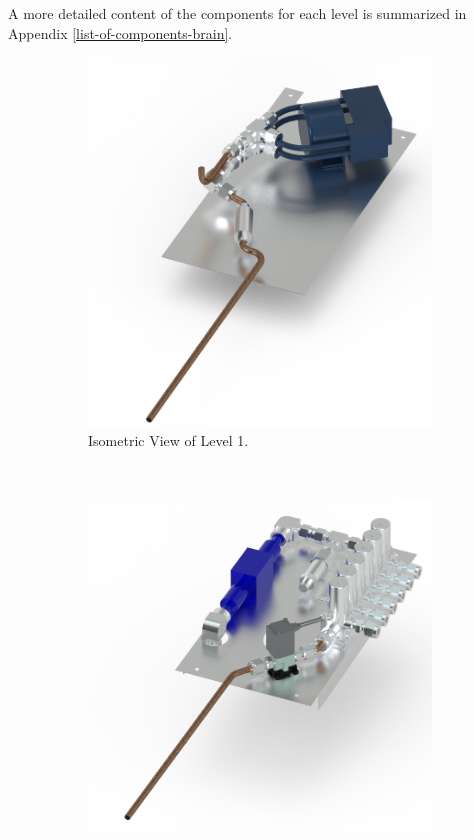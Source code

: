 A more detailed content of the components for each level is summarized in Appendix \ref{list-of-components-brain}.
\begin{figure}[H]
    \centering
    \begin{subfigure}[b]{0.3\textwidth}
    \centering
    \includegraphics[width=\textwidth]{4-experiment-design/img/Mechanical/Figure_24a.png}
    \caption{Isometric View of Level 1.}
    \label{level_1}
    \end{subfigure}
    ~
    \begin{subfigure}[b]{0.3\textwidth}
    \centering
    \includegraphics[width=\textwidth]{4-experiment-design/img/Mechanical/Figure_24b.png}

\end{subfigure}
\end{figure}
